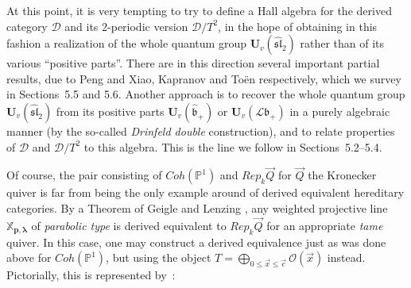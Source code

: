 \documentclass[a4paper,10pt]{amsart}
\def\U{\mathbf{U}}
\def\O{\mathcal{O}}
\def\bo{\mathfrak{b}}
\def\xpl{\mathbb{X}_{\mathbf{p},\boldsymbol{\lambda}}}
\numberwithin{equation}{section}
\begin{document}
{\vspace{.1in}

At this point, it is very tempting to try to define a Hall algebra for the derived category $\mathcal{D}$ and its $2$-periodic version $\mathcal{D}/T^2$, in the hope of obtaining in this fashion a realization of the whole quantum group $\U_v(\widehat{\mathfrak{sl}}_2)$ rather than of its various ``positive parts''. There are in this direction several important partial results, due to Peng and Xiao, Kapranov and To\"en respectively, which we survey in Sections~5.5 and 5.6. Another approach is to recover the whole quantum group $\U_v(\widehat{\mathfrak{sl}}_2)$ from its positive parts $\U_v(\widehat{\bo}_+)$ or $\U_v(\mathcal{L}\bo_+)$ in a purely algebraic manner (by the so-called \textit{Drinfeld double} construction), and to relate properties of $\mathcal{D}$ and $\mathcal{D}/T^2$ to this algebra.
This is the line we follow in Sections~5.2--5.4.

\vspace{.2in}

Of course, the pair consisting of $Coh(\mathbb{P}^1)$ and $Rep_k\vec{Q}$ for $\vec{Q}$ the Kronecker quiver is far from being the only example around of derived equivalent hereditary categories. By a Theorem of Geigle and Lenzing \cite{GL}, any weighted projective line $\xpl$ of \textit{parabolic type} is derived equivalent to $Rep_k\vec{Q}$ for an appropriate \textit{tame} quiver. In this case, one may construct a derived equivalence just as was done above for $Coh(\mathbb{P}^1)$, but using the object
$T=\bigoplus_{0 \leq \vec{x} \leq \vec{c}} \O(\vec{x})$ instead. Pictorially, this is represented by~:

\vspace{.6in}

}
\end{document}
